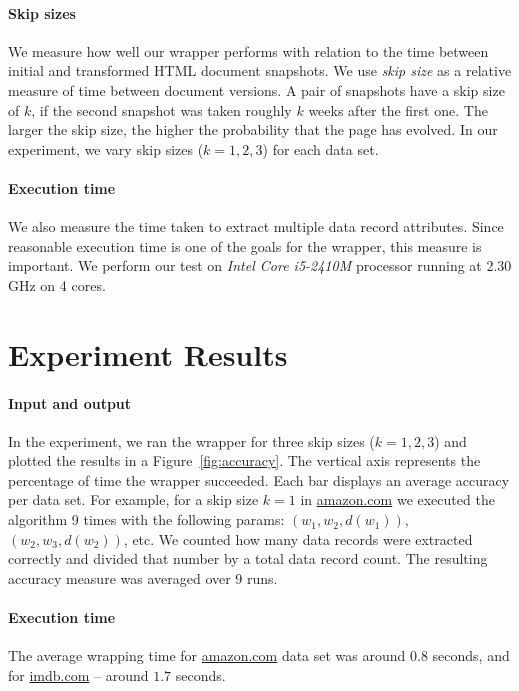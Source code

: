 \paragraph{Skip sizes} We measure how well our wrapper performs with relation to the time between initial and transformed HTML document snapshots. We use \emph{skip size} as a relative measure of time between document versions. A pair of snapshots have a skip size of $k$, if the second snapshot was taken roughly $k$ weeks after the first one. The larger the skip size, the higher the probability that the page has evolved. In our experiment, we vary skip sizes ($k = 1, 2, 3$) for each data set.

\paragraph{Execution time} We also measure the time taken to extract multiple data record attributes. Since reasonable execution time is one of the goals for the wrapper, this measure is important. We perform our test on \emph{Intel Core i5-2410M} processor running at 2.30 GHz on 4 cores.


\section{Experiment Results}

\paragraph{Input and output} In the experiment, we ran the wrapper for three skip sizes ($k = 1, 2, 3$) and plotted the results in a Figure~\ref{fig:accuracy}. The vertical axis represents the percentage of time the wrapper succeeded. Each bar displays an average accuracy per data set. For example, for a skip size $k=1$ in \url{amazon.com} we executed the algorithm 9 times with the following params: $(w_1,w_2,d(w_1))$, $(w_2,w_3,d(w_2))$, etc. We counted how many data records were extracted correctly and divided that number by a total data record count. The resulting accuracy measure was averaged over 9 runs.

\paragraph{Execution time} The average wrapping time for \url{amazon.com} data set was around $0.8$ seconds, and for \url{imdb.com} -- around $1.7$ seconds.

